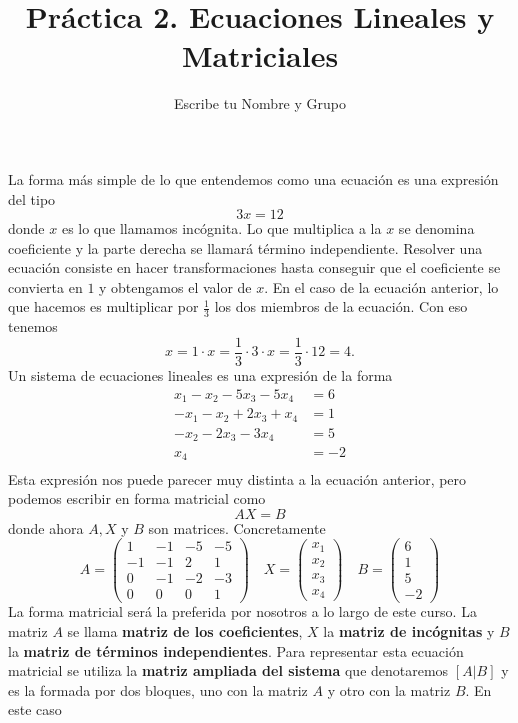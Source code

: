 \documentclass{amsart}
\title{Práctica 2. Ecuaciones Lineales y Matriciales}
\author{Escribe tu Nombre y Grupo}
\begin{document}
\maketitle

La forma más simple de lo que entendemos como una ecuación es una expresión 
del tipo 
$$ 3x = 12 $$
donde $x$ es lo que llamamos incógnita. Lo que multiplica a la $x$ se denomina
coeficiente y la parte derecha se llamará término independiente. Resolver una
ecuación consiste en hacer transformaciones hasta conseguir que el coeficiente
se convierta en $1$ y obtengamos el valor de $x$. En el caso de la ecuación 
anterior, lo que hacemos es multiplicar por $\frac{1}{3}$ los dos miembros de
la ecuación. Con eso tenemos 
$$ x = 1 \cdot x = \frac{1}{3} \cdot 3 \cdot x = \frac{1}{3} \cdot 12 = 4. $$
Un sistema de ecuaciones lineales es una expresión de la forma 
\begin{align*}
x_{1} - x_{2} - 5 x_{3} - 5 x_{4} &= 6 \\
-x_{1} - x_{2} + 2 x_{3} + x_{4} &= 1 \\
-x_{2} - 2 x_{3} - 3 x_{4} &= 5 \\
x_{4} &= -2 \\
\end{align*}
Esta expresión nos puede parecer muy distinta a la ecuación anterior, pero
podemos escribir en forma matricial como 
$$ AX = B $$
donde ahora $A,X$ y $B$ son matrices. Concretamente 
$$ A = \left(\begin{array}{rrrr}
1 & -1 & -5 & -5 \\
-1 & -1 & 2 & 1 \\
0 & -1 & -2 & -3 \\
0 & 0 & 0 & 1
\end{array}\right) \quad
X = \left(\begin{array}{r} x_1 \\ x_2 \\ x_3 \\ x_4 \end{array}\right) \quad
B = \left(\begin{array}{r} 6 \\ 1 \\ 5 \\ -2 \end{array}\right)$$
La forma matricial será la preferida por nosotros a lo largo de este curso. 
La matriz $A$ se llama {\bf matriz de los coeficientes}, $X$ la {\bf matriz de
incógnitas} y $B$ la {\bf matriz de términos independientes}. Para representar
esta ecuación matricial se utiliza la {\bf matriz ampliada del sistema} que 
denotaremos $[A|B]$ y es la formada por dos bloques, uno con la matriz $A$ y 
otro con la matriz $B$. En este caso 
\end{document}

